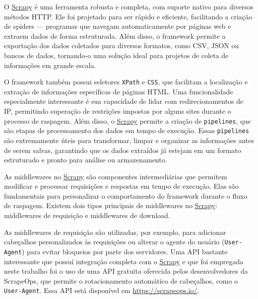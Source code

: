 \documentclass[
  12pt,
  a4paper,
]{scrreprt}
\begin{document}
O \href{https://docs.scrapy.org/en/latest}{Scrapy} é uma ferramenta
robusta e completa, com suporte nativo para diversos métodos HTTP. Ele
foi projetado para ser rápido e eficiente, facilitando a criação de
spiders --- programas que navegam automaticamente por páginas web e
extraem dados de forma estruturada. Além disso, o framework permite a
exportação dos dados coletados para diversos formatos, como CSV, JSON ou
bancos de dados, tornando-o uma solução ideal para projetos de coleta de
informações em grande escala.

\vspace{12pt}

O framework também possui seletores \texttt{XPath} e \texttt{CSS}, que
facilitam a localização e extração de informações específicas de páginas
HTML. Uma funcionalidade especialmente interessante é sua capacidade de
lidar com redirecionamentos de IP, permitindo superação de restrições
impostas por alguns sites durante o processo de raspagem. Além disso, o
\href{https://docs.scrapy.org/en/latest}{Scrapy} permite a criação de
\texttt{pipelines}, que são etapas de processamento dos dados em tempo
de execução. Essas \texttt{pipelines} são extremamente úteis para
transformar, limpar e organizar as informações antes de serem salvas,
garantindo que os dados extraídos já estejam em um formato estruturado e
pronto para análise ou armazenamento.

\vspace{12pt}

As middlewares no \href{https://docs.scrapy.org/en/latest}{Scrapy} são
componentes intermediárias que permitem modificar e processar
requisições e respostas em tempo de execução. Elas são fundamentais para
personalizar o comportamento do framework durante o fluxo de raspagem.
Existem dois tipos principais de middlewares no
\href{https://docs.scrapy.org/en/latest}{Scrapy}: middlewares de
requisição e middlewares de download.

\vspace{12pt}

As middlewares de requisição são utilizadas, por exemplo, para adicionar
cabeçalhos personalizados às requisições ou alterar o agente do usuário
(\texttt{User-Agent}) para evitar bloqueios por parte dos servidores.
Uma API bastante interessante que possuí integração completa com o
\href{https://docs.scrapy.org/en/latest}{Scrapy} e que foi empregada
neste trabalho foi o uso de uma API gratuita oferecida pelos
desenvolvedores da ScrapeOps, que permite o rotacionamento automático de
cabeçalhos, como o \texttt{User-Agent}. Essa API está disponível em
\url{https://scrapeops.io/}.
\end{document}
